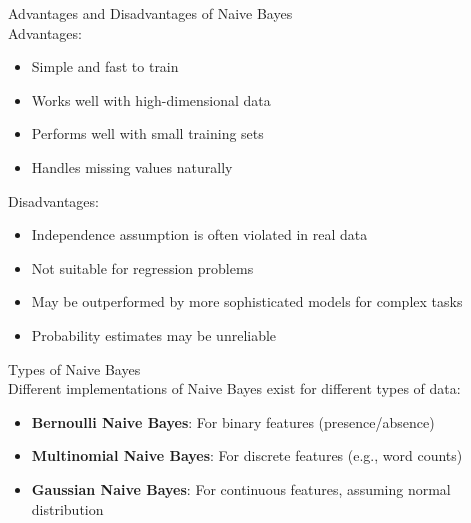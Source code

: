 \begin{theorem}{Advantages and Disadvantages of Naive Bayes}\\
Advantages:
\begin{itemize}
    \item Simple and fast to train
    \item Works well with high-dimensional data
    \item Performs well with small training sets
    \item Handles missing values naturally
\end{itemize}
Disadvantages:
\begin{itemize}
    \item Independence assumption is often violated in real data
    \item Not suitable for regression problems
    \item May be outperformed by more sophisticated models for complex tasks
    \item Probability estimates may be unreliable
\end{itemize}
\end{theorem}

\multend

\begin{concept}{Types of Naive Bayes}\\
Different implementations of Naive Bayes exist for different types of data:
\begin{itemize}
    \item \textbf{Bernoulli Naive Bayes}: For binary features (presence/absence)
    \item \textbf{Multinomial Naive Bayes}: For discrete features (e.g., word counts)
    \item \textbf{Gaussian Naive Bayes}: For continuous features, assuming normal distribution
\end{itemize}
\end{concept}

